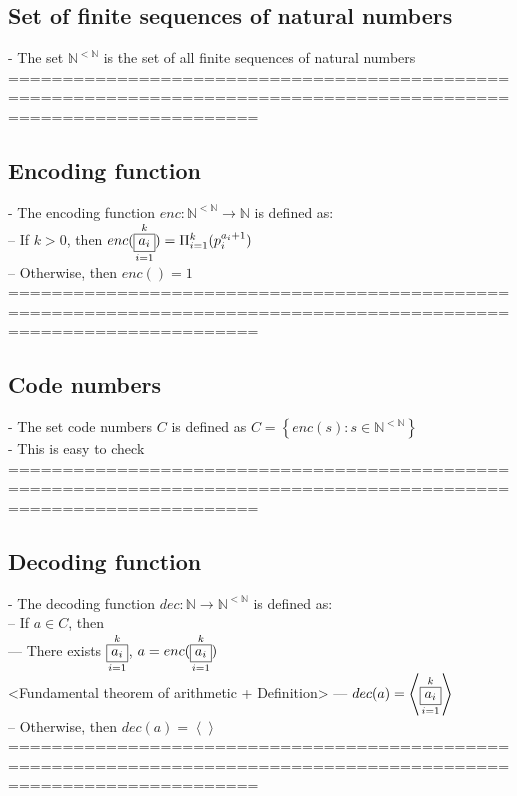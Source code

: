 \documentclass{book}
\newcommand{\set}[1]{\left\{ #1 \right\}}
\newcommand{\seq}[1]{\left\langle #1 \right\rangle}
\newcommand{\vdc}[3]{\underset{#2}{\overset{#3}{\fbox{$#1$}}}}
\begin{document}
\subsection{Set of finite sequences of natural numbers} %
	- The set $\mathbb{N}^{<\mathbb{N}}$ is the set of all finite sequences of natural numbers \\
	===================================================================================================================
\subsection{Encoding function} %
	- The encoding function $enc: \mathbb{N}^{<\mathbb{N}} \rightarrow \mathbb{N}$ is defined as: \\
		-- If $k > 0$, then $enc(\vdc{a_i}{i=1}{k}) = \Pi_{i=1}^{k}(p_i^{a_i + 1})$ \\
		-- Otherwise, then $enc() = 1$ \\
	===================================================================================================================
\subsection{Code numbers} %
	- The set code numbers $C$ is defined as $C = \set{enc(s): s \in \mathbb{N}^{<\mathbb{N}}}$ \\
	- This is easy to check \\
	===================================================================================================================
\subsection{Decoding function} %
	- The decoding function $dec: \mathbb{N} \rightarrow \mathbb{N}^{<\mathbb{N}}$ is defined as: \\
		-- If $a \in C$, then \\
			--- There exists $\vdc{a_i}{i=1}{k}$, $a = enc(\vdc{a_i}{i=1}{k})$ \\ <Fundamental theorem of arithmetic + Definition>
			--- $dec(a) = \seq{\vdc{a_i}{i=1}{k}}$ \\
		-- Otherwise, then $dec(a) = \seq{}$ \\
	===================================================================================================================
\end{document}
